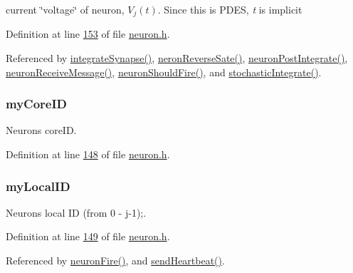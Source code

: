 current \char`\"{}voltage\char`\"{} of neuron, $V_j(t)$. Since this is P\+D\+E\+S, {\itshape t} is implicit 



Definition at line \hyperlink{neuron_8h_source_l00153}{153} of file \hyperlink{neuron_8h_source}{neuron.\+h}.



Referenced by \hyperlink{neuron_8c_source_l00199}{integrate\+Synapse()}, \hyperlink{neuron_8c_source_l00232}{neron\+Reverse\+Sate()}, \hyperlink{neuron_8c_source_l00214}{neuron\+Post\+Integrate()}, \hyperlink{neuron_8c_source_l00103}{neuron\+Receive\+Message()}, \hyperlink{neuron_8c_source_l00161}{neuron\+Should\+Fire()}, and \hyperlink{neuron_8c_source_l00191}{stochastic\+Integrate()}.

\hypertarget{structneuron_state_a76ef99e5766b6e36c3f41a2920e8c56c}{}
\subsubsection[{my\+Core\+I\+D}]{ my\+Core\+I\+D}\label{structneuron_state_a76ef99e5766b6e36c3f41a2920e8c56c}


Neuron\textquotesingle{}s core\+I\+D. 



Definition at line \hyperlink{neuron_8h_source_l00148}{148} of file \hyperlink{neuron_8h_source}{neuron.\+h}.

\hypertarget{structneuron_state_ac24762c24aede292a2ce5df78114881c}{}
\subsubsection[{my\+Local\+I\+D}]{ my\+Local\+I\+D}\label{structneuron_state_ac24762c24aede292a2ce5df78114881c}


Neuron\textquotesingle{}s local I\+D (from 0 -\/ j-\/1);. 



Definition at line \hyperlink{neuron_8h_source_l00149}{149} of file \hyperlink{neuron_8h_source}{neuron.\+h}.



Referenced by \hyperlink{neuron_8c_source_l00167}{neuron\+Fire()}, and \hyperlink{neuron_8c_source_l00179}{send\+Heartbeat()}.


